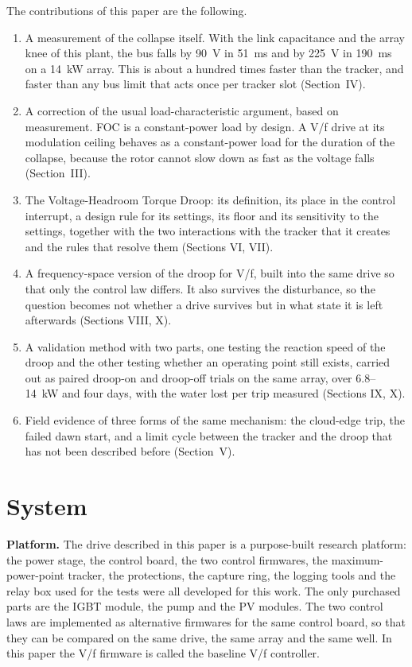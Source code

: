 \documentclass[journal]{IEEEtran}
\begin{document}
The contributions of this paper are the following.
\begin{enumerate}
\item A measurement of the collapse itself. With the link capacitance and the array knee of this plant, the bus falls by 90~V in 51~ms and by 225~V in 190~ms on a 14~kW array. This is about a hundred times faster than the tracker, and faster than any bus limit that acts once per tracker slot (Section~IV).
\item A correction of the usual load-characteristic argument, based on measurement. FOC is a constant-power load by design. A V/f drive at its modulation ceiling behaves as a constant-power load for the duration of the collapse, because the rotor cannot slow down as fast as the voltage falls (Section~III).
\item The Voltage-Headroom Torque Droop: its definition, its place in the control interrupt, a design rule for its settings, its floor and its sensitivity to the settings, together with the two interactions with the tracker that it creates and the rules that resolve them (Sections VI, VII).
\item A frequency-space version of the droop for V/f, built into the same drive so that only the control law differs. It also survives the disturbance, so the question becomes not whether a drive survives but in what state it is left afterwards (Sections VIII, X).
\item A validation method with two parts, one testing the reaction speed of the droop and the other testing whether an operating point still exists, carried out as paired droop-on and droop-off trials on the same array, over 6.8--14~kW and four days, with the water lost per trip measured (Sections IX, X).
\item Field evidence of three forms of the same mechanism: the cloud-edge trip, the failed dawn start, and a limit cycle between the tracker and the droop that has not been described before (Section~V).
\end{enumerate}

\section{System}

\textbf{Platform.} The drive described in this paper is a purpose-built research platform: the power stage, the control board, the two control firmwares, the maximum-power-point tracker, the protections, the capture ring, the logging tools and the relay box used for the tests were all developed for this work. The only purchased parts are the IGBT module, the pump and the PV modules. The two control laws are implemented as alternative firmwares for the same control board, so that they can be compared on the same drive, the same array and the same well. In this paper the V/f firmware is called the baseline V/f controller.
\end{document}
